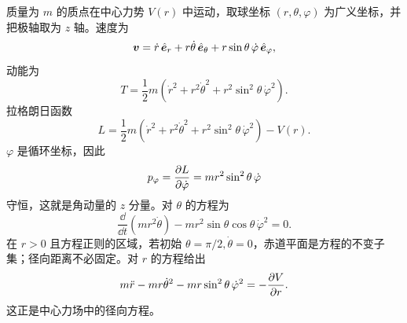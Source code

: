 \begin{example}[球坐标中的质点]
质量为 $m$ 的质点在中心力势 $V(r)$ 中运动，取球坐标 $(r,\theta,\varphi)$ 为广义坐标，并把极轴取为 $z$ 轴。速度为
\[
\boldsymbol{v}=\dot r\,\hat{\boldsymbol{e}}_r+r\dot\theta\,\hat{\boldsymbol{e}}_\theta+r\sin\theta\,\dot\varphi\,\hat{\boldsymbol{e}}_\varphi,
\]
动能为
\[
T=\frac12m\left(\dot r^2+r^2\dot\theta^2+r^2\sin^2\theta\,\dot\varphi^2\right).
\]
拉格朗日函数
\[
L=\frac12m\left(\dot r^2+r^2\dot\theta^2+r^2\sin^2\theta\,\dot\varphi^2\right)-V(r).
\]
$\varphi$ 是循环坐标，因此
\[
p_\varphi=\frac{\partial L}{\partial \dot\varphi}=mr^2\sin^2\theta\,\dot\varphi
\]
守恒，这就是角动量的 $z$ 分量。对 $\theta$ 的方程为
\[
\frac{\dd}{\dd t}\left(mr^2\dot\theta\right)
-mr^2\sin\theta\cos\theta\,\dot\varphi^2=0.
\]
在 $r>0$ 且方程正则的区域，若初始 $\theta=\pi/2,\dot\theta=0$，赤道平面是方程的不变子集；径向距离不必固定。对 $r$ 的方程给出
\[
m\ddot r-mr\dot\theta^2-mr\sin^2\theta\,\dot\varphi^2
=-\frac{\partial V}{\partial r}.
\]
这正是中心力场中的径向方程。
\end{example}

